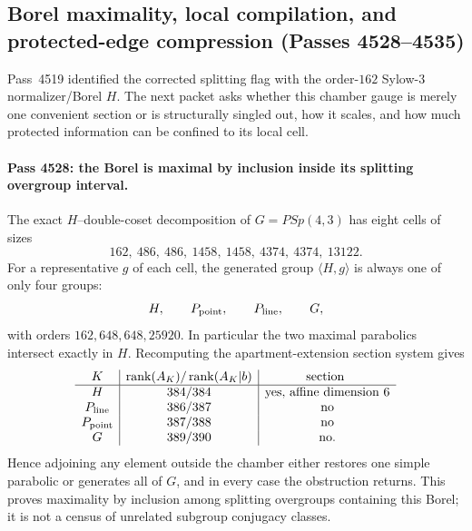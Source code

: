 \subsection{Borel maximality, local compilation, and protected-edge compression (Passes 4528--4535)}
\label{sec:pass4528-4535-borel-compiler-edge}

Pass~4519 identified the corrected splitting flag with the order-$162$
Sylow-$3$ normalizer/Borel $H$.  The next packet asks whether this chamber
gauge is merely one convenient section or is structurally singled out, how it
scales, and how much protected information can be confined to its local cell.

\paragraph{Pass 4528: the Borel is maximal by inclusion inside its splitting overgroup interval.}
The exact $H$--double-coset decomposition of $G=PSp(4,3)$ has eight cells of
sizes
\[
 162,\ 486,\ 486,\ 1458,\ 1458,\ 4374,\ 4374,\ 13122.
\]
For a representative $g$ of each cell, the generated group $\langle H,g\rangle$
is always one of only four groups:
\[
 H,\qquad P_{\rm point},\qquad P_{\rm line},\qquad G,
\]
with orders $162,648,648,25920$.  In particular the two maximal parabolics
intersect exactly in $H$.  Recomputing the apartment-extension section system
gives
\[
\begin{array}{c|c|c}
K & \operatorname{rank}(A_K) / \operatorname{rank}(A_K|b) & \text{section}\ \\ \hline
H & 384/384 & \text{yes, affine dimension }6\\
P_{\rm line}&386/387&\text{no}\\
P_{\rm point}&387/388&\text{no}\\
G&389/390&\text{no}.
\end{array}
\]
Hence adjoining any element outside the chamber either restores one simple
parabolic or generates all of $G$, and in every case the obstruction returns.
This proves maximality by inclusion among splitting overgroups containing this
Borel; it is not a census of unrelated subgroup conjugacy classes.

